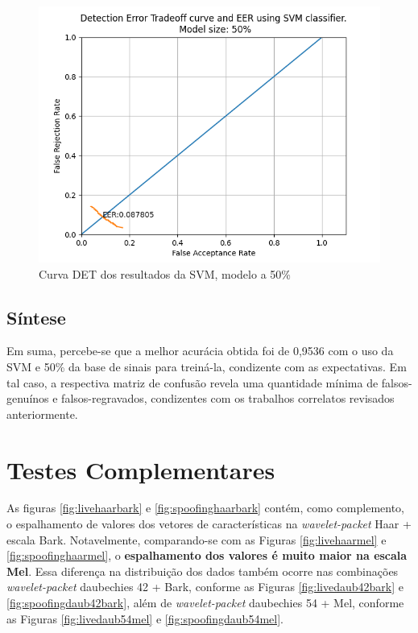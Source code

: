 			\begin{figure}[h]
				\centering
				\includegraphics[width=.8\linewidth]{images/results/det/DET_SVM_50}
				\caption{Curva DET dos resultados da SVM, modelo a 50\%}
				\label{fig:detsvm50}
			\end{figure}

			

		\subsection{Síntese}
   			\par Em suma, percebe-se que a melhor acurácia obtida foi de 0,9536 com o uso da SVM e 50\% da base de sinais para treiná-la, condizente com as expectativas. Em tal caso, a respectiva matriz de confusão revela uma quantidade mínima de falsos-genuínos e falsos-regravados, condizentes com os trabalhos correlatos revisados anteriormente.

	\section{Testes Complementares}
	\label{chap:testsResults:sec:Experimento05}
		As figuras \ref{fig:livehaarbark} e \ref{fig:spoofinghaarbark} contém, como complemento, o espalhamento de valores dos vetores de características na \textit{wavelet-packet} Haar + escala Bark. Notavelmente, comparando-se com as Figuras \ref{fig:livehaarmel} e \ref{fig:spoofinghaarmel}, o \textbf{espalhamento dos valores é muito maior na escala \textbf{Mel}}. Essa diferença na distribuição dos dados também ocorre nas combinações \textit{wavelet-packet} daubechies 42 + Bark, conforme as Figuras \ref{fig:livedaub42bark} e \ref{fig:spoofingdaub42bark}, além de \textit{wavelet-packet} daubechies 54 + Mel, conforme as Figuras \ref{fig:livedaub54mel} e \ref{fig:spoofingdaub54mel}.
		
